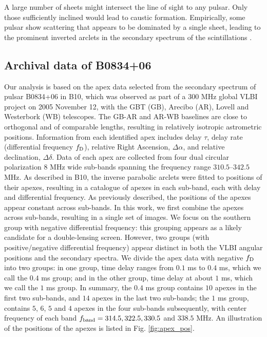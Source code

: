 \documentclass[useAMS,usenatbib]{mn2e}
\begin{document}
A large number of sheets might intersect the line of sight to any
pulsar. Only those sufficiently inclined would lead to caustic
formation. Empirically, some pulsar show scattering that appears to be dominated by a
single sheet, leading to the prominent inverted
arclets in the secondary spectrum of the scintillations \citep{2001ApJ...549L..97S}.

\subsection{Archival data of B0834+06}
\label{21}
Our analysis is based on the apex data selected from the secondary
spectrum of pulsar B0834+06 in B10, which was
observed as part of a 300 MHz global VLBI project on 2005 November 12, with
the GBT (GB), Arecibo (AR), Lovell and Westerbork (WB) telescopes.  The GB-AR and AR-WB
baselines are close to orthogonal and of comparable lengths, resulting
in relatively isotropic astrometric positions.
Information from each identified apex includes delay $\tau$,
delay rate (differential frequency $f_{\rm D}$), relative Right Ascension,
$\Delta\alpha$, and relative declination, $\Delta\delta$.
Data of each apex are collected from four dual circular polarization $8$ MHz wide sub-bands spanning the frequency range $310.5$--$342.5$ MHz. 
As described in B10, the inverse parabolic
arclets were fitted to positions of their apexes, resulting in a
catalogue of apexes in each sub-band, each with delay and differential
frequency.  As previously described, the positions of the apexes
appear constant across sub-bands.  In this work, we first combine the
apexes across sub-bands, resulting in a single set of images.  We focus on
the southern group with negative differential frequency: this
grouping appears as a likely candidate for a double-lensing screen. However, two groups (with positive/negative differential frequency) appear distinct in both the VLBI angular positions and the secondary spectra. We divide the apex data with negative $f_{\rm D}$ into two
groups: in one group, time delay ranges from $0.1$ ms to $0.4$ ms,
which we call the $0.4$ ms group; and in the other group, time delay at
about $1$ ms, which we call the $1$ ms group.  In summary, the
$0.4$ ms group contains $10$ apexes in the first two sub-bands, and $14$ apexes in the last two sub-bands; the $1$ ms group, contains $5$, $6$, $5$ and $4$ apexes in the four sub-bands subsequently, with center frequency of each band $f_{\rm band}=314.5, 322.5, 330.5$ and $ 338.5$ MHz.  An illustration of the positions of the apexes is listed in Fig. \ref{fig:apex_pos}.
\end{document}
